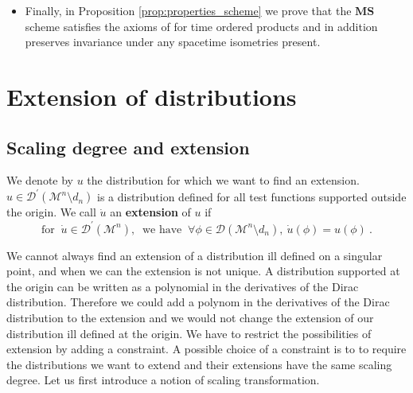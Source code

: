 \documentclass[12pt]{book}
\newcommand{\MS}{\textbf{MS}}
\newcommand{\Dcal}{\mathcal{D}}
\newcommand{\Mcal}{\mathcal{M}}
\theoremstyle{break}
\begin{document}
\begin{itemize}
\item Finally, in Proposition \ref{prop:properties_scheme} we prove that the $\MS$ scheme satisfies the axioms of \cite{hollands_local_2001,hollands_existence_2002} for time ordered products and in addition preserves invariance under any spacetime isometries present.


\end{itemize}


\section{Extension of distributions} \label{p:EXT_DISTRIB}


\subsection{Scaling degree and extension}


We denote by $u$ the distribution for which we want to find an extension. $u \in \Dcal^\prime(\Mcal^n \setminus d_n )$ is a distribution defined for all test functions supported outside the origin. We call $\dot{u}$ an \textbf{extension} of $u$ if 
%
\begin{equation*}
\mbox{for } \ \dot{u} \in \Dcal^\prime(\Mcal^n), \ \mbox{ we have } \ \forall \phi \in \Dcal\left(\Mcal^n \setminus d_n \right), \ \dot{u}(\phi) = u(\phi) \ .
\end{equation*}


We cannot always find an extension of a distribution ill defined on a singular point, and when we can the extension is not unique. A distribution supported at the origin can be written as a polynomial in the derivatives of the Dirac distribution. Therefore we could add a polynom in the derivatives of the Dirac distribution to the extension and we would not change the extension of our distribution ill defined at the origin. We have to restrict the possibilities of extension by adding a constraint. A possible choice of a constraint is to to require the distributions we want to extend and their extensions have the same scaling degree. Let us first introduce a notion of scaling transformation.
\end{document}
